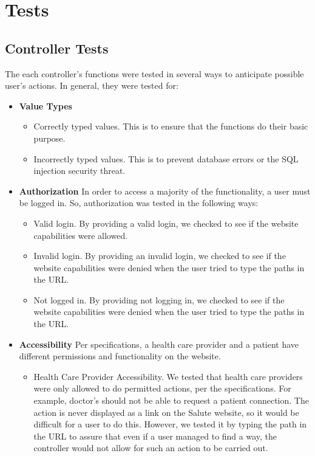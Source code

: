 \documentclass[12pt]{report}
\begin{document}
\section{Tests}

\subsection{Controller Tests}
The each controller's functions were tested in several ways to anticipate possible user's actions. In general, they were tested for:
\begin{itemize}
\item \textbf{Value Types}
\begin{itemize}
\item Correctly typed values. This is to ensure that the functions do their basic purpose.
\item Incorrectly typed values. This is to prevent database errors or the SQL injection security threat.
\end{itemize}
\item \textbf{Authorization} In order to access a majority of the functionality, a user must be logged in. So, authorization was tested in the following ways: 
\begin{itemize}
\item  Valid login. By providing a valid login, we checked to see if the website capabilities were allowed. 
\item Invalid login. By providing an invalid login, we checked to see if the website capabilities were denied when the user tried to type the paths in the URL.
\item Not logged in. By providing not logging in, we checked to see if the website capabilities were denied when the user tried to type the paths in the URL.
\end{itemize}
\item\textbf{Accessibility} Per specifications, a health care provider and a patient have different permissions and functionality on the website. 
\begin{itemize}
\item Health Care Provider Accessibility. We tested that health care providers were only allowed to do permitted actions, per the specifications. For example, doctor's should not be able to request a patient connection. The action is never displayed as a link on the Salute website, so it would be difficult for a user to do this. However, we tested it by typing the path in the URL to assure that even if a user managed to find a way, the controller would not allow for such an action to be carried out. 

\end{itemize}
\end{itemize}
\end{document}
